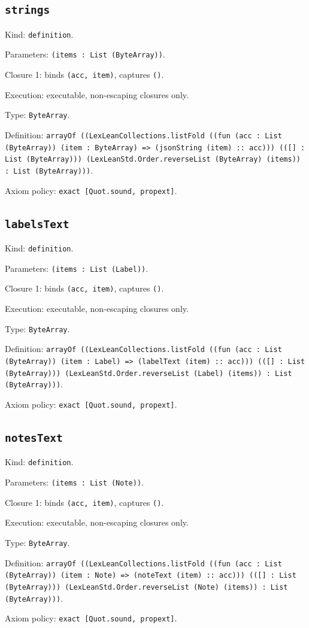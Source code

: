 \documentclass[11pt]{article}
\begin{document}
\subsection*{\texttt{strings}}
\noindent Kind: \texttt{definition}.\par
\noindent Parameters: \texttt{(items : List (ByteArray))}.\par
\noindent Closure 1: binds \texttt{(acc, item)}, captures \texttt{()}.\par
\noindent Execution: executable, non-escaping closures only.\par
\noindent Type: \texttt{ByteArray}.\par
\noindent Definition: \texttt{arrayOf ((LexLeanCollections.listFold ((fun (acc : List (ByteArray)) (item : ByteArray) => (jsonString (item) :: acc))) (([] : List (ByteArray))) (LexLeanStd.Order.reverseList (ByteArray) (items)) : List (ByteArray)))}.\par
\noindent Axiom policy: \texttt{exact [Quot.sound, propext]}.\par
\subsection*{\texttt{labelsText}}
\noindent Kind: \texttt{definition}.\par
\noindent Parameters: \texttt{(items : List (Label))}.\par
\noindent Closure 1: binds \texttt{(acc, item)}, captures \texttt{()}.\par
\noindent Execution: executable, non-escaping closures only.\par
\noindent Type: \texttt{ByteArray}.\par
\noindent Definition: \texttt{arrayOf ((LexLeanCollections.listFold ((fun (acc : List (ByteArray)) (item : Label) => (labelText (item) :: acc))) (([] : List (ByteArray))) (LexLeanStd.Order.reverseList (Label) (items)) : List (ByteArray)))}.\par
\noindent Axiom policy: \texttt{exact [Quot.sound, propext]}.\par
\subsection*{\texttt{notesText}}
\noindent Kind: \texttt{definition}.\par
\noindent Parameters: \texttt{(items : List (Note))}.\par
\noindent Closure 1: binds \texttt{(acc, item)}, captures \texttt{()}.\par
\noindent Execution: executable, non-escaping closures only.\par
\noindent Type: \texttt{ByteArray}.\par
\noindent Definition: \texttt{arrayOf ((LexLeanCollections.listFold ((fun (acc : List (ByteArray)) (item : Note) => (noteText (item) :: acc))) (([] : List (ByteArray))) (LexLeanStd.Order.reverseList (Note) (items)) : List (ByteArray)))}.\par
\noindent Axiom policy: \texttt{exact [Quot.sound, propext]}.\par
\end{document}
